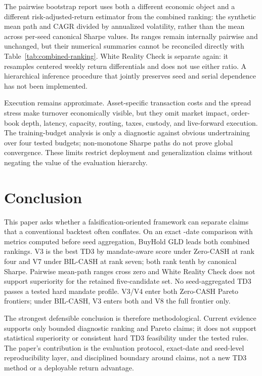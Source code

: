 \documentclass[11pt]{article}
\newcommand{\cashzero}{Zero-CASH}
\newcommand{\cashbil}{BIL-CASH}
\begin{document}
The pairwise bootstrap report uses both a different economic object and a different risk-adjusted-return estimator from the combined ranking: the synthetic mean path and CAGR divided by annualized volatility, rather than the mean across per-seed canonical Sharpe values. Its ranges remain internally pairwise and unchanged, but their numerical summaries cannot be reconciled directly with Table~\ref{tab:combined-ranking}. White Reality Check is separate again: it resamples centered weekly return differentials and does not use either ratio. A hierarchical inference procedure that jointly preserves seed and serial dependence has not been implemented.

Execution remains approximate. Asset-specific transaction costs and the spread stress make turnover economically visible, but they omit market impact, order-book depth, latency, capacity, routing, taxes, custody, and live-forward execution. The training-budget analysis is only a diagnostic against obvious undertraining over four tested budgets; non-monotone Sharpe paths do not prove global convergence. These limits restrict deployment and generalization claims without negating the value of the evaluation hierarchy.

\section{Conclusion}

This paper asks whether a falsification-oriented framework can separate claims that a conventional backtest often conflates. On an exact \AlignedWeeks{}-date comparison with metrics computed before seed aggregation, BuyHold GLD leads both combined rankings. V3 is the best TD3 by mandate-aware score under \cashzero{} at rank four and V7 under \cashbil{} at rank seven; both rank tenth by canonical Sharpe. Pairwise mean-path ranges cross zero and White Reality Check does not support superiority for the retained five-candidate set. No seed-aggregated TD3 passes a tested hard mandate profile. V3/V4 enter both \cashzero{} Pareto frontiers; under \cashbil{}, V3 enters both and V8 the full frontier only.

The strongest defensible conclusion is therefore methodological. Current evidence supports only bounded diagnostic ranking and Pareto claims; it does not support statistical superiority or consistent hard TD3 feasibility under the tested rules. The paper's contribution is the evaluation protocol, exact-date and seed-level reproducibility layer, and disciplined boundary around claims, not a new TD3 method or a deployable return advantage.
\end{document}
